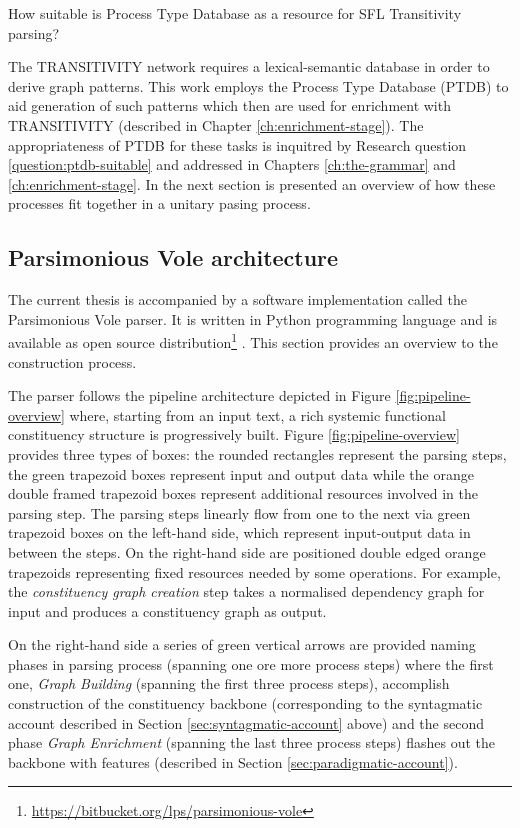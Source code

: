 \begin{question}\label{question:ptdb-suitable}
    How suitable is Process Type Database as a resource for SFL Transitivity parsing? 
\end{question}


The TRANSITIVITY network requires a lexical-semantic database in order to derive graph patterns. This work employs the Process Type Database (PTDB) \citep{Neale2002} to aid generation of such patterns which then are used for enrichment with TRANSITIVITY (described in Chapter \ref{ch:enrichment-stage}). The appropriateness of PTDB for these tasks is inquitred by Research question \ref{question:ptdb-suitable} and addressed in Chapters \ref{ch:the-grammar} and \ref{ch:enrichment-stage}. In the next section is presented an overview of how these processes fit together in a unitary pasing process.

\subsection{Parsimonious Vole architecture}
\label{sec:architecture}
The current thesis is accompanied by a software implementation called the Parsimonious Vole parser. It is written in Python programming language and is available as open source distribution\footnote{\url{https://bitbucket.org/lps/parsimonious-vole}} . This section provides an overview to the construction process.

The parser follows the pipeline architecture depicted in Figure \ref{fig:pipeline-overview} where, starting from an input text, a rich systemic functional constituency structure is progressively built. Figure \ref{fig:pipeline-overview} provides three types of boxes: the rounded rectangles represent the parsing steps, the green trapezoid boxes represent input and output data while the orange double framed trapezoid boxes represent additional resources involved in the parsing step. The parsing steps linearly flow from one to the next via green trapezoid boxes on the left-hand side, which represent input-output data in between the steps. On the right-hand side are positioned double edged orange trapezoids representing fixed resources needed by some operations. For example, the \textit{constituency graph creation} step takes a normalised dependency graph for input and produces a constituency graph as output.

On the right-hand side a series of green vertical arrows are provided naming phases in parsing process (spanning one ore more process steps) where the first one, \textit{Graph Building} (spanning the first three process steps), accomplish construction of the constituency backbone (corresponding to the syntagmatic account described in Section \ref{sec:syntagmatic-account} above) and the second phase \textit{Graph Enrichment} (spanning the last three process steps) flashes out the backbone with features (described in Section \ref{sec:paradigmatic-account}). 

